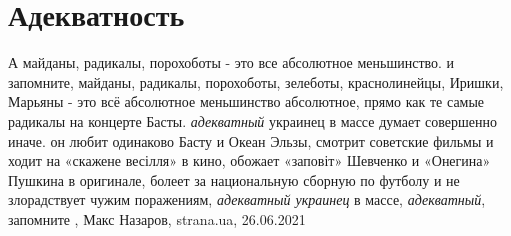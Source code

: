  
 
 
 
 
\chapter{Адекватность}

А майданы, радикалы, порохоботы - это все абсолютное меньшинство.  и
запомните, майданы, радикалы, порохоботы, зелеботы, краснолинейцы, Иришки,
Марьяны - это всё абсолютное меньшинство абсолютное, прямо как те самые
радикалы на концерте Басты. \emph{адекватный} украинец в массе думает совершенно иначе.
он любит одинаково Басту и Океан Эльзы, смотрит советские фильмы и ходит на
«скажене весілля» в кино, обожает «заповіт» Шевченко и «Онегина» Пушкина в
оригинале, болеет за национальную сборную по футболу и не злорадствует чужим
поражениям, \emph{адекватный украинец} в массе, \emph{адекватный}, запомните
, Макс Назаров, strana.ua, 26.06.2021

